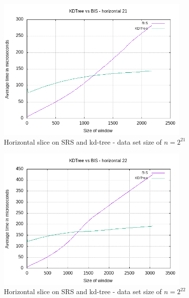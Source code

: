 \begin{figure}[h]
    \centering
    \includegraphics[width = 0.85\textwidth]{pictures/analysis/hori_21.png}
    \caption{Horizontal slice on SRS and kd-tree - data set size of $n=2^{21}$}\label{fig:hori_21}
\end{figure}

\begin{figure}[h]
    \centering
    \includegraphics[width = 0.85\textwidth]{pictures/analysis/hori_22.png}
    \caption{Horizontal slice on SRS and kd-tree - data set size of $n=2^{22}$}\label{fig:hori_22}
\end{figure}


